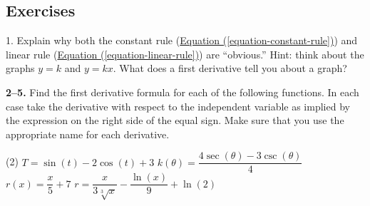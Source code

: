 \documentclass[10pt,oneside,]{book}
\theoremstyle{plain}
\theoremstyle{definition}
\numberwithin{equation}{section}
\newcommand{\fe}[2]{#1\mathopen{}\left(#2\right)\mathclose{}}
\begin{document}
\subsection[Exercises]{Exercises}\label{exercises-36}
\begin{exerciselist}
\item[1.]\hypertarget{exercise-367}{\null}Explain why both the constant rule (\hyperref[equation-constant-rule]{Equation (\ref{equation-constant-rule})}) and linear rule (\hyperref[equation-linear-rule]{Equation (\ref{equation-linear-rule})}) are ``obvious.'' Hint: think about the graphs \(y=k\) and \(y=kx\).  What does a first derivative tell you about a graph?%
\par\smallskip
\end{exerciselist}
\textbf{2--5. }\hypertarget{exercisegroup-75}{\null}Find the first derivative formula for each of the following functions.  In each case take the derivative with respect to the independent variable as implied by the expression on the right side of the equal sign.  Make sure that you use the appropriate name for each derivative.%
\par
\begin{exercisegroup}(2)
\exercise[2.]\hypertarget{exercise-368}{\null}\(T=\fe{\sin}{t}-2\fe{\cos}{t}+3\)%
\exercise[3.]\hypertarget{exercise-369}{\null}\(\fe{k}{\theta}=\dfrac{4\fe{\sec}{\theta}-3\fe{\csc}{\theta}}{4}\)%
\exercise[4.]\hypertarget{exercise-370}{\null}\(\fe{r}{x}=\dfrac{x}{5}+7\)%
\exercise[5.]\hypertarget{exercise-371}{\null}\(r=\dfrac{x}{3\sqrt[3]{x}}-\dfrac{\fe{\ln}{x}}{9}+\fe{\ln}{2}\)%
\end{exercisegroup}
\par\smallskip\noindent
\typeout{************************************************}
\typeout{************************************************}
\end{document}
